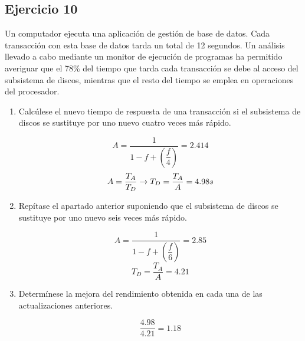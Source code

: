 \subsection{Ejercicio 10}
\noindent
Un computador ejecuta una aplicación de gestión de base de datos. Cada transacción con esta base de datos tarda un total de 12 segundos. Un análisis llevado a cabo mediante un monitor de ejecución de programas ha permitido averiguar que el 78\% del tiempo que tarda cada transacción se debe al acceso del subsistema de discos, mientras que el resto del tiempo se emplea en operaciones del procesador.
\begin{enumerate}
    \item Calcúlese el nuevo tiempo de respuesta de una transacción si el subsistema de discos se sustituye por uno nuevo cuatro veces más rápido.
\begin{tcolorbox}[colback=white,colframe=cyan!50!black,fonttitle=\bfseries]
\[
A=\dfrac{1}{1-f+\left(\dfrac{f}{4}\right)}=2.414
\]
\[
A=\dfrac{T_A}{T_D}\rightarrow T_D=\dfrac{T_A}{A}=4.98s
\]
\end{tcolorbox}    
    \item Repítase el apartado anterior suponiendo que el subsistema de discos se sustituye por uno nuevo seis veces más rápido.
\begin{tcolorbox}[colback=white,colframe=cyan!50!black,fonttitle=\bfseries]
\[
A=\dfrac{1}{1-f+\left(\dfrac{f}{6}\right)}=2.85
\]
\[
T_D=\dfrac{T_A}{A}=4.21
\]
\end{tcolorbox}    
    \item Determínese la mejora del rendimiento obtenida en cada una de las actualizaciones anteriores.
\begin{tcolorbox}[colback=white,colframe=cyan!50!black,fonttitle=\bfseries]
\[
\dfrac{4.98}{4.21}=1.18
\]
\end{tcolorbox}    
\end{enumerate}
